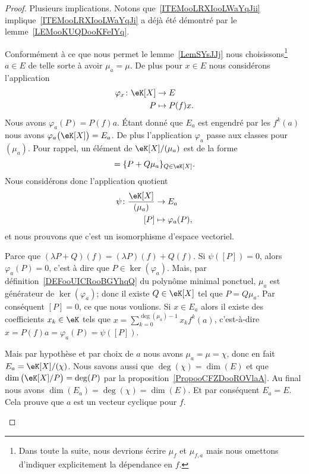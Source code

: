 \begin{proof}
	Plusieurs implications. Notons que~\ref{ITEMooLRXIooLWaYqJii} implique~\ref{ITEMooLRXIooLWaYqJi} a déjà été démontré par le lemme~\ref{LEMooKUQDooKFeIYq}.
	\begin{subproof}
		Conformément à ce que nous permet le lemme~\ref{LemSYsJJj} nous choisissons\footnote{Dans toute la suite, nous devrions écrire \( \mu_f\) et \( \mu_{f,a}\) mais nous omettons d'indiquer explicitement la dépendance en \( f\).} \( a\in E\) de telle sorte à avoir \( \mu_a=\mu\). De plus pour \( x\in E\) nous considérons l'application
		\begin{equation}
			\begin{aligned}
				\varphi_x\colon \eK[X] & \to E          \\
				P                      & \mapsto P(f)x.
			\end{aligned}
		\end{equation}
		Nous avons \( \varphi_a(P)=P(f)a\). Étant donné que \( E_{a}\) est engendré par les \( f^k(a)\) nous avons \( \varphi_a\big( \eK[X] \big)=E_a\). De plus l'application \( \varphi_a\) passe aux classes pour \( (\mu_a)\). Pour rappel, un élément de \( \eK[X]/(\mu_a)\) est de la forme
		\begin{equation}
			[P]=\{ P+Q\mu_a \}_{Q\in \eK[X]}.
		\end{equation}
		Nous considérons donc l'application quotient
		\begin{equation}
			\begin{aligned}
				\psi\colon \frac{ \eK[X] }{ (\mu_a) } & \to E_a               \\
				[P]                                   & \mapsto \varphi_a(P),
			\end{aligned}
		\end{equation}
		et nous prouvons que c'est un isomorphisme d'espace vectoriel.
		\begin{subproof}
			\spitem[Linéaire]
			Parce que \( (\lambda P+Q)(f)=(\lambda P)(f)+Q(f)\).
			\spitem[Injectif]
			Si \( \psi([P])=0\), alors \( \varphi_a(P)=0\), c'est à dire que \( P\in \ker(\varphi_a)\).  Mais, par définition~\ref{DEFooUICRooBGYhqQ} du polynôme minimal ponctuel, \( \mu_a\) est générateur de \( \ker(\varphi_a)\); donc il existe \( Q\in \eK[X]\) tel que \( P=Q\mu_a\). Par conséquent \( [P]=0\), ce que nous voulions.
			\spitem[Surjectif]
			Si \( x\in E_a\) alors il existe des coefficients \( x_k\in \eK\) tels que \( x=\sum_{k=0}^{\deg(\mu_a)-1}x_kf^k(a)\), c'est-à-dire \( x=P(f)a=\varphi_a(P)=\psi([P])\).
		\end{subproof}
		Mais par hypothèse et par choix de \( a\) nous avons \( \mu_a=\mu=\chi\), donc en fait \( E_a=\eK[X]/(\chi)\). Nous savons aussi que \( \deg(\chi)=\dim(E)\) et que \( \dim\big( \eK[X]/P \big)=\deg(P)\) par la proposition~\ref{PropooCFZDooROVlaA}. Au final nous avons \( \dim(E_a)=\deg(\chi)=\dim(E)\). Et par conséquent \( E_a=E\). Cela prouve que \( a\) est un vecteur cyclique pour \( f\).


\end{subproof}
\end{proof}
